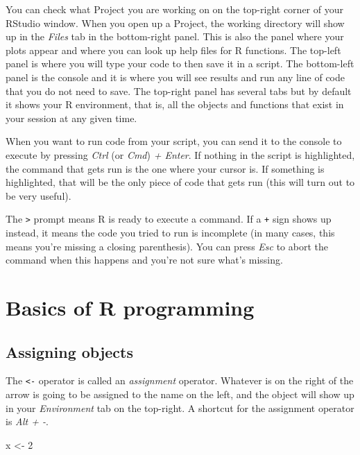 \documentclass[
]{book}
\newenvironment{Shaded}{\begin{snugshade}}{\end{snugshade}}
\newcommand{\DecValTok}[1]{\textcolor[rgb]{0.00,0.00,0.81}{#1}}
\newcommand{\NormalTok}[1]{#1}
\newcommand{\OtherTok}[1]{\textcolor[rgb]{0.56,0.35,0.01}{#1}}
\begin{document}
You can check what Project you are working on on the top-right corner of your
RStudio window. When you open up a Project, the working directory will show up
in the \emph{Files} tab in the bottom-right panel. This is also the panel where your
plots appear and where you can look up help files for R functions. The top-left
panel is where you will type your code to then save it in a script. The
bottom-left panel is the console and it is where you will see results and run
any line of code that you do not need to save. The top-right panel has several
tabs but by default it shows your R environment, that is, all the objects and
functions that exist in your session at any given time.

When you want to run code from your script, you can send it to the console to
execute by pressing \emph{Ctrl} (or \emph{Cmd}) \emph{+ Enter}. If nothing in the script is
highlighted, the command that gets run is the one where your cursor is. If
something is highlighted, that will be the only piece of code that gets run
(this will turn out to be very useful).

The \texttt{\textgreater{}} prompt means R is ready to execute a command. If a \texttt{+} sign shows up
instead, it means the code you tried to run is incomplete (in many cases,
this means you're missing a closing parenthesis). You can press \emph{Esc} to abort the
command when this happens and you're not sure what's missing.

\hypertarget{basics-of-r-programming}{%
\section{Basics of R programming}\label{basics-of-r-programming}}

\hypertarget{assigning-objects}{%
\subsection{Assigning objects}\label{assigning-objects}}

The \texttt{\textless{}-} operator is called an \emph{assignment} operator. Whatever is on the right of
the arrow is going to be assigned to the name on the left, and the object will
show up in your \emph{Environment} tab on the top-right. A shortcut for the assignment
operator is \emph{Alt + -}.

\begin{Shaded}
\begin{Highlighting}[]
\NormalTok{x }\OtherTok{\textless{}{-}} \DecValTok{2}
\end{Highlighting}
\end{Shaded}
\end{document}
